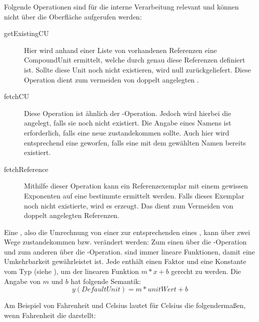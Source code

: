 Folgende Operationen sind für die interne Verarbeitung relevant und können nicht über die Oberfläche aufgerufen werden:
\begin{description}

\item[getExistingCU]
Hier wird anhand einer Liste von vorhandenen Referenzen eine CompoundUnit ermittelt, welche durch genau diese Referenzen definiert ist. Sollte diese Unit noch nicht existieren, wird null zurückgeliefert. Diese Operation dient zum vermeiden von doppelt angelegten .
\item[fetchCU]
Diese Operation ist ähnlich der -Operation. Jedoch wird hierbei die  angelegt, falls sie noch nicht existiert. Die Angabe eines Namens ist erforderlich, falls eine neue  zustandekommen sollte. Auch hier wird entsprechend eine  geworfen, falls eine  mit dem gewählten Namen bereits existiert.
\item[fetchReference]
Mithilfe dieser Operation kann ein Referenzexemplar mit einem gewissen Exponenten auf eine bestimmte  ermittelt werden. Falls dieses Exemplar noch nicht existierte, wird es erzeugt. Das dient zum Vermeiden von doppelt angelegten Referenzen.
\end{description}

\newpage
{}\label{ConversionsKapitel} 


Eine , also die Umrechnung von einer  zur entsprechenden  eines , kann über zwei Wege zustandekommen bzw. verändert werden: Zum einen über die -Operation und zum anderen über die -Operation.
 sind immer lineare Funktionen, damit eine Umkehrbarkeit gewährleistet ist. Jede  enthält einen Faktor und eine Konstante vom Typ  (siehe ), um der linearen Funktion $m*x+b$ gerecht zu werden. 
Die Angabe von $m$ und $b$ hat folgende Semantik: 
\[y (DefaultUnit) = m * unitWert + b\]


Am Beispiel von Fahrenheit und Celsius lautet für Celsius die  folgendermaßen, wenn Fahrenheit die  darstellt:

